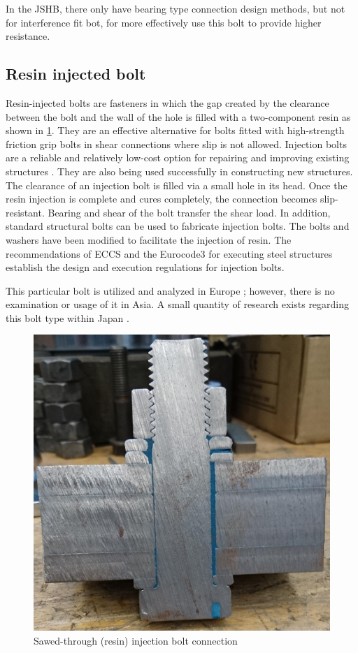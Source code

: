 In the JSHB, there only have bearing type connection design methods, but not for interference fit bot, for more effectively use this bolt to provide higher resistance.


\subsection{Resin injected bolt}

Resin-injected bolts are fasteners in which the gap created by the clearance between the bolt and the wall of the hole is filled with a two-component resin as shown in \ref{fig-resinbolt}. They are an effective alternative for bolts fitted with high-strength friction grip bolts in shear connections where slip is not allowed. Injection bolts are a reliable and relatively low-cost option for repairing and improving existing structures \cite{gresnigt1996injbolt}. They are also being used successfully in constructing new structures. The clearance of an injection bolt is filled via a small hole in its head. Once the resin injection is complete and cures completely, the connection becomes slip-resistant. Bearing and shear of the bolt transfer the shear load. In addition, standard structural bolts can be used to fabricate injection bolts. The bolts and washers have been modified to facilitate the injection of resin. The recommendations of ECCS and the Eurocode3 \cite{eurocode3-21,EN14399}for executing steel structures establish the design and execution regulations for injection bolts.

This particular bolt is utilized and analyzed in Europe \cite{pedrosa2022injbolt-mec,kolstein2017injbolt-mec,pedrosa2020injbolt-fati,pedrosa2021injbolt-fati,gresnigt2000injtbolt-use,ungermann2023injbolt-mec}; however, there is no examination or usage of it in Asia. A small quantity of research exists regarding this bolt type within Japan \cite{fujino2010resbolt,Ryota2018resbolt}.

\begin{figure}[htbp]
    \centering
    \includegraphics[width=0.65\linewidth]{imgs//ch2/resin-bolt.jpg}
    \caption{Sawed-through (resin) injection bolt connection \cite{Axel2017injbolt}}
    \label{fig-resinbolt}
\end{figure}

